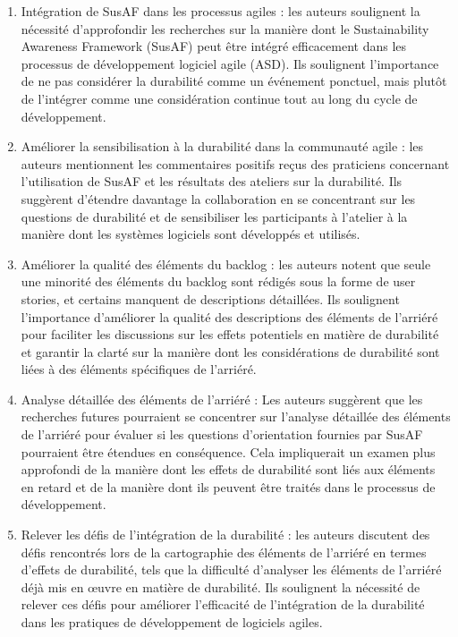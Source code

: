 \begin{enumerate}
    \item Intégration de SusAF dans les processus agiles : les auteurs soulignent la nécessité d'approfondir les recherches sur la manière dont le Sustainability Awareness Framework (SusAF) peut être intégré efficacement dans les processus de développement logiciel agile (ASD). Ils soulignent l’importance de ne pas considérer la durabilité comme un événement ponctuel, mais plutôt de l’intégrer comme une considération continue tout au long du cycle de développement.
    \item Améliorer la sensibilisation à la durabilité dans la communauté agile : les auteurs mentionnent les commentaires positifs reçus des praticiens concernant l'utilisation de SusAF et les résultats des ateliers sur la durabilité. Ils suggèrent d'étendre davantage la collaboration en se concentrant sur les questions de durabilité et de sensibiliser les participants à l'atelier à la manière dont les systèmes logiciels sont développés et utilisés.
    \item Améliorer la qualité des éléments du backlog : les auteurs notent que seule une minorité des éléments du backlog sont rédigés sous la forme de user stories, et certains manquent de descriptions détaillées. Ils soulignent l’importance d’améliorer la qualité des descriptions des éléments de l’arriéré pour faciliter les discussions sur les effets potentiels en matière de durabilité et garantir la clarté sur la manière dont les considérations de durabilité sont liées à des éléments spécifiques de l’arriéré.
    \item Analyse détaillée des éléments de l'arriéré : Les auteurs suggèrent que les recherches futures pourraient se concentrer sur l'analyse détaillée des éléments de l'arriéré pour évaluer si les questions d'orientation fournies par SusAF pourraient être étendues en conséquence. Cela impliquerait un examen plus approfondi de la manière dont les effets de durabilité sont liés aux éléments en retard et de la manière dont ils peuvent être traités dans le processus de développement.
    \item Relever les défis de l'intégration de la durabilité : les auteurs discutent des défis rencontrés lors de la cartographie des éléments de l'arriéré en termes d'effets de durabilité, tels que la difficulté d'analyser les éléments de l'arriéré déjà mis en œuvre en matière de durabilité. Ils soulignent la nécessité de relever ces défis pour améliorer l’efficacité de l’intégration de la durabilité dans les pratiques de développement de logiciels agiles.
\end{enumerate}

